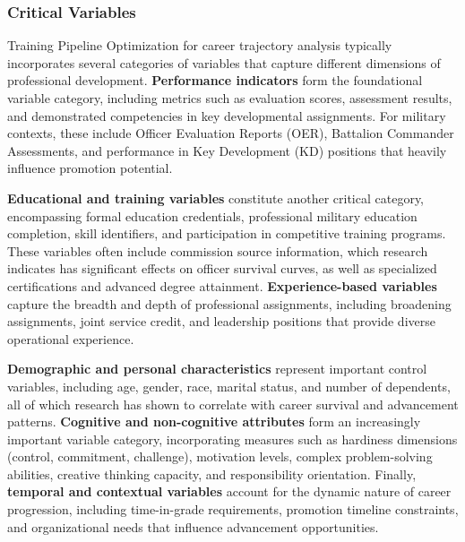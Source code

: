 \documentclass[main.tex]{subfiles}
\begin{document}
\subsubsection{Critical Variables}

Training Pipeline Optimization for career trajectory analysis typically incorporates several categories of variables that capture different dimensions of professional development\parencite{army_indicators,career_optimization}. \textbf{Performance indicators} form the foundational variable category, including metrics such as evaluation scores, assessment results, and demonstrated competencies in key developmental assignments\parencite{army_indicators}. For military contexts, these include Officer Evaluation Reports (OER), Battalion Commander Assessments, and performance in Key Development (KD) positions that heavily influence promotion potential\parencite{army_indicators}.

\textbf{Educational and training variables} constitute another critical category, encompassing formal education credentials, professional military education completion, skill identifiers, and participation in competitive training programs\parencite{army_indicators}. These variables often include commission source information, which research indicates has significant effects on officer survival curves, as well as specialized certifications and advanced degree attainment\parencite{army_indicators}. \textbf{Experience-based variables} capture the breadth and depth of professional assignments, including broadening assignments, joint service credit, and leadership positions that provide diverse operational experience\parencite{army_indicators}.

\textbf{Demographic and personal characteristics} represent important control variables, including age, gender, race, marital status, and number of dependents, all of which research has shown to correlate with career survival and advancement patterns\parencite{army_indicators}. \textbf{Cognitive and non-cognitive attributes} form an increasingly important variable category, incorporating measures such as hardiness dimensions (control, commitment, challenge), motivation levels, complex problem-solving abilities, creative thinking capacity, and responsibility orientation\parencite{army_indicators}. Finally, \textbf{temporal and contextual variables} account for the dynamic nature of career progression, including time-in-grade requirements, promotion timeline constraints, and organizational needs that influence advancement opportunities\parencite{army_indicators}.
\end{document}
